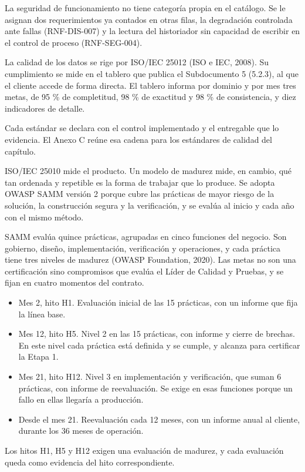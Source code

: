\documentclass[subdoc]{../../comun/overfore}
\begin{document}
La seguridad de funcionamiento no tiene categoría propia en el catálogo. Se le asignan dos requerimientos ya contados en otras filas, la degradación controlada ante fallas (RNF-DIS-007) y la lectura del historiador sin capacidad de escribir en el control de proceso (RNF-SEG-004).

La calidad de los datos se rige por ISO/IEC 25012 (ISO e IEC, 2008). Su cumplimiento se mide en el tablero que publica el Subdocumento 5 (5.2.3), al que el cliente accede de forma directa. El tablero informa por dominio y por mes tres metas, de 95 \% de completitud, 98 \% de exactitud y 98 \% de consistencia, y diez indicadores de detalle.

Cada estándar se declara con el control implementado y el entregable que lo evidencia. El Anexo C reúne esa cadena para los estándares de calidad del capítulo.

ISO/IEC 25010 mide el producto. Un modelo de madurez mide, en cambio, qué tan ordenada y repetible es la forma de trabajar que lo produce. Se adopta OWASP SAMM versión 2 porque cubre las prácticas de mayor riesgo de la solución, la construcción segura y la verificación, y se evalúa al inicio y cada año con el mismo método.

SAMM evalúa quince prácticas, agrupadas en cinco funciones del negocio. Son gobierno, diseño, implementación, verificación y operaciones, y cada práctica tiene tres niveles de madurez (OWASP Foundation, 2020). Las metas no son una certificación sino compromisos que evalúa el Líder de Calidad y Pruebas, y se fijan en cuatro momentos del contrato.

\begin{itemize}
\item Mes 2, hito H1. Evaluación inicial de las 15 prácticas, con un informe que fija la línea base.
\item Mes 12, hito H5. Nivel 2 en las 15 prácticas, con informe y cierre de brechas. En este nivel cada práctica está definida y se cumple, y alcanza para certificar la Etapa 1.
\item Mes 21, hito H12. Nivel 3 en implementación y verificación, que suman 6 prácticas, con informe de reevaluación. Se exige en esas funciones porque un fallo en ellas llegaría a producción.
\item Desde el mes 21. Reevaluación cada 12 meses, con un informe anual al cliente, durante los 36 meses de operación.
\end{itemize}
Los hitos H1, H5 y H12 exigen una evaluación de madurez, y cada evaluación queda como evidencia del hito correspondiente.
\end{document}
